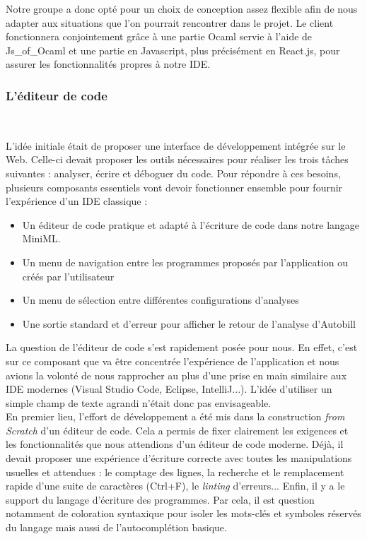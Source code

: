 \documentclass[12pt]{article}
\begin{document}
Notre groupe a donc opté pour un choix de conception assez flexible afin de nous adapter aux situations que l'on pourrait rencontrer dans le projet. Le client fonctionnera conjointement grâce à une partie Ocaml servie à l'aide de Js\_of\_Ocaml et une partie en Javascript, plus précisément en React.js\cite{react}, pour assurer les fonctionnalités propres à notre IDE.

\subsubsection{L'éditeur de code}\

L'idée initiale était de proposer une interface de développement intégrée sur le Web. Celle-ci devait proposer les outils nécessaires pour réaliser les trois tâches suivantes : analyser, écrire et déboguer du code. Pour répondre à ces besoins, plusieurs composants essentiels vont devoir fonctionner ensemble pour fournir l'expérience d'un IDE classique :
\begin{itemize}
      \item Un éditeur de code pratique et adapté à l'écriture de code dans notre langage MiniML.
      \item Un menu de navigation entre les programmes proposés par l'application ou créés par l'utilisateur
      \item Un menu de sélection entre différentes configurations d'analyses
      \item Une sortie standard et d'erreur pour afficher le retour de l'analyse d'Autobill \\
\end{itemize}

La question de l'éditeur de code s'est rapidement posée pour nous. En effet, c'est sur ce composant que va être concentrée l'expérience de l'application et nous avions la volonté de nous rapprocher au plus d'une prise en main similaire aux IDE modernes (Visual Studio Code, Eclipse, IntelliJ...). L'idée d'utiliser un simple champ de texte agrandi n'était donc pas envisageable. \\

En premier lieu, l'effort de développement a été mis dans la construction \textit{from Scratch} d'un éditeur de code. Cela a permis de fixer clairement les exigences et les fonctionnalités que nous attendions d'un éditeur de code moderne. Déjà, il devait proposer une expérience d'écriture correcte avec toutes les manipulations usuelles et attendues : le comptage des lignes, la recherche et le remplacement rapide d'une suite de caractères (Ctrl+F), le \textit{linting} d'erreurs... Enfin, il y a le support du langage d'écriture des programmes. Par cela, il est question notamment de coloration syntaxique pour isoler les mots-clés et symboles réservés du langage mais aussi de l'autocomplétion basique.  \\
\end{document}
